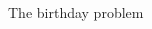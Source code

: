 \documentclass[9pt,aspectratio=169]{beamer}
\begin{document}
\begin{frame}{The birthday problem}
  \begin{columns}[T]
    \begin{column}{0.5\textwidth}
    \end{column}
    \begin{column}{0.5\textwidth}
    \end{column}
  \end{columns}
\end{frame}

\end{document}
